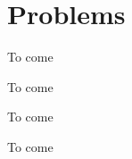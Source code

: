 \section*{Problems}
%

\begin{problem}
\label{prob_finite_depth}
To come
\end{problem}

\begin{problem}
\label{prob_grav_cap_dispersion}
To come
\end{problem}

\begin{problem}
\label{prob_two_cosines}
To come
\end{problem}

\begin{problem}
\label{prob_energy}
To come
\end{problem}

